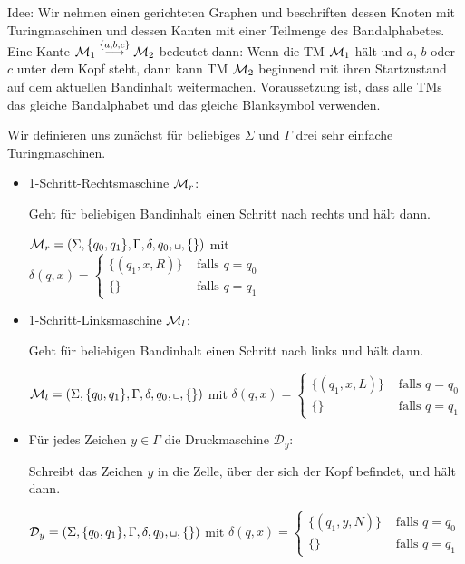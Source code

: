 Idee: Wir nehmen einen gerichteten Graphen und beschriften dessen Knoten mit Turingmaschinen und dessen Kanten mit einer Teilmenge des Bandalphabetes.
Eine Kante $\mathcal{M}_1\stackrel{\{a,b,c\}}{\longrightarrow}\mathcal{M}_2$ bedeutet dann:
Wenn die \ac{TM} $\mathcal{M}_1$ hält und $a$, $b$ oder $c$ unter dem Kopf steht, dann kann \ac{TM} $\mathcal{M}_2$ beginnend mit ihren Startzustand auf dem aktuellen Bandinhalt weitermachen.
Voraussetzung ist, dass alle \ac{TM}s das gleiche Bandalphabet und das gleiche Blanksymbol verwenden.

\begin{Bsp}\label{bsp:simpletms} Wir definieren uns zunächst für beliebiges $\Sigma$ und $\Gamma$ drei sehr einfache Turingmaschinen. 
 \begin{itemize}
  \item 1-Schritt-Rechtsmaschine $\mathcal{M}_r$:
  
  Geht für beliebigen Bandinhalt einen Schritt nach rechts und hält dann.
  
  $\M_r=\left(\Sigma,\{q_0,q_1\},\Gamma,\delta,q_0,\blank,\{\}\right)$ mit
  $\delta(q,x)=\begin{cases}\{(q_1, x, R)\} & \text{ falls } q = q_0\\ \{\} & \text{ falls } q = q_1\end{cases}$
  
  \item 1-Schritt-Linksmaschine $\mathcal{M}_l$:
  
  Geht für beliebigen Bandinhalt einen Schritt nach links und hält dann.

  $\M_l=\left(\Sigma,\{q_0,q_1\},\Gamma,\delta,q_0,\blank,\{\}\right)$ mit
  $\delta(q,x)=\begin{cases}\{(q_1, x, L)\} & \text{ falls } q = q_0\\ \{\} & \text{ falls } q = q_1\end{cases}$
  
  \item Für jedes Zeichen $y\in\Gamma$ die Druckmaschine $\mathcal{D}_y$:
  
  Schreibt das Zeichen $y$ in die Zelle, über der sich der Kopf befindet, und hält dann.

  $\mathcal{D}_y=\left(\Sigma,\{q_0,q_1\},\Gamma,\delta,q_0,\blank,\{\}\right)$ mit
  $\delta(q,x)=\begin{cases}\{(q_1, y, N)\} & \text{ falls } q = q_0\\ \{\} & \text{ falls } q = q_1\end{cases}$

 \end{itemize}
\end{Bsp}


